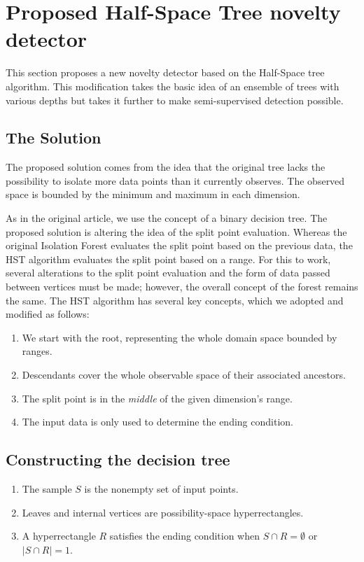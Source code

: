 \section{Proposed Half-Space Tree novelty detector}
\label{sec:novelty_isolation_forest}
This section proposes a new novelty detector based on the Half-Space tree algorithm.
This modification takes the basic idea of an ensemble of trees with various depths but takes it further to make semi-supervised detection possible.

\subsection{The Solution}
The proposed solution comes from the idea that the original tree lacks the possibility to isolate more data points than it currently observes.
The observed space is bounded by the minimum and maximum in each dimension.

As in the original article, we use the concept of a binary decision tree. The proposed solution is altering the idea of the split point evaluation. Whereas the original Isolation Forest evaluates the split point based on the previous data, the HST algorithm evaluates the split point based on a range. For this to work, several alterations to the split point evaluation and the form of data passed between vertices must be made; however, the overall concept of the forest remains the same.
The HST algorithm has several key concepts, which we adopted and modified as follows:

\begin{enumerate}
    \item We start with the root, representing the whole domain space bounded by ranges.
    \item Descendants cover the whole observable space of their associated ancestors. 
    \item The split point is in the \emph{middle} of the given dimension’s range.
    \item The input data is only used to determine the ending condition.
\end{enumerate}

\subsection{Constructing the decision tree}

\begin{enumerate}
    \item The sample \(S\) is the nonempty set of input points.
    \item Leaves and internal vertices are possibility-space hyperrectangles. 
    \item A hyperrectangle $R$ satisfies the ending condition when \(S \cap R = \emptyset\) or \(| S \cap R | = 1\).
\end{enumerate}



